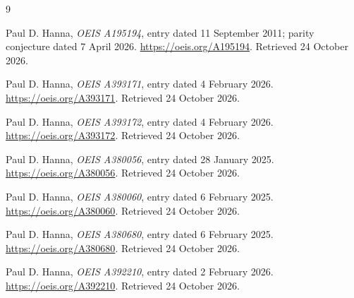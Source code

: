 \documentclass[11pt,a4paper]{article}
\theoremstyle{remark}
\begin{document}
\clearpage
\begin{thebibliography}{9}

Paul D. Hanna, \emph{OEIS A195194}, entry dated 11 September 2011;
parity conjecture dated 7 April 2026.
\url{https://oeis.org/A195194}. Retrieved 24 October 2026.

Paul D. Hanna, \emph{OEIS A393171}, entry dated 4 February 2026.
\url{https://oeis.org/A393171}. Retrieved 24 October 2026.

Paul D. Hanna, \emph{OEIS A393172}, entry dated 4 February 2026.
\url{https://oeis.org/A393172}. Retrieved 24 October 2026.

Paul D. Hanna, \emph{OEIS A380056}, entry dated 28 January 2025.
\url{https://oeis.org/A380056}. Retrieved 24 October 2026.

Paul D. Hanna, \emph{OEIS A380060}, entry dated 6 February 2025.
\url{https://oeis.org/A380060}. Retrieved 24 October 2026.

Paul D. Hanna, \emph{OEIS A380680}, entry dated 6 February 2025.
\url{https://oeis.org/A380680}. Retrieved 24 October 2026.

Paul D. Hanna, \emph{OEIS A392210}, entry dated 2 February 2026.
\url{https://oeis.org/A392210}. Retrieved 24 October 2026.

\end{thebibliography}
\end{document}

